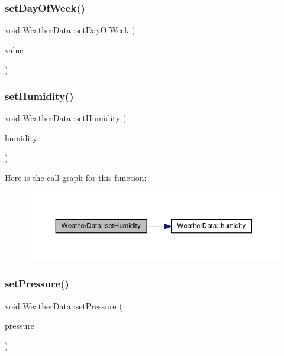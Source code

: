 \subsubsection{\texorpdfstring{set\+Day\+Of\+Week()}{setDayOfWeek()}}
{\footnotesize\ttfamily void Weather\+Data\+::set\+Day\+Of\+Week (\begin{DoxyParamCaption}\item[{const Q\+String \&}]{value }\end{DoxyParamCaption})}

\mbox{\label{class_weather_data_aad895695b5f0651c58657973f2140509}} 
\subsubsection{\texorpdfstring{set\+Humidity()}{setHumidity()}}
{\footnotesize\ttfamily void Weather\+Data\+::set\+Humidity (\begin{DoxyParamCaption}\item[{const Q\+String \&}]{humidity }\end{DoxyParamCaption})}

Here is the call graph for this function\+:\nopagebreak
\begin{figure}[H]
\begin{center}
\leavevmode
\includegraphics[width=350pt]{class_weather_data_aad895695b5f0651c58657973f2140509_cgraph}
\end{center}
\end{figure}
\mbox{\label{class_weather_data_ad5b453016656864e2bc3a09fc75919a0}} 
\subsubsection{\texorpdfstring{set\+Pressure()}{setPressure()}}
{\footnotesize\ttfamily void Weather\+Data\+::set\+Pressure (\begin{DoxyParamCaption}\item[{const Q\+String \&}]{pressure }\end{DoxyParamCaption})}

